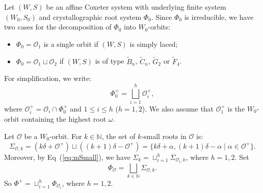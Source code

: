 \documentclass{amsart}
\theoremstyle{definition}
\newcommand{\mo}{\mathcal{O}}
\begin{document}
Let $(W,S)$ be an affine Coxeter system with underlying finite system $(W_0,S_0)$ and crystallographic root system $\Phi_0$. Since $\Phi_0$ is irreducible, we have two cases for the decomposition of $\Phi_0$ into $W_0$-orbits:
\begin{itemize}
    \item $\Phi_0=\mo_1$ is a single orbit if $(W,S)$ is simply laced;
    \item $\Phi_0=\mo_1\sqcup\mo_2$ if $(W,S)$ is of type $\tilde B_n$, $\tilde C_n$, $\tilde G_2$ or $\tilde F_4$.
\end{itemize}
For simplification, we write:
$$
\Phi_0^+=\bigsqcup_{i=1}^h \mo_i^+,
$$ 
where $\mo_i^+=\mo_i \cap \Phi_0^+$ and $1\leq i\leq h$ ($h=1,2$). We also assume that $\mo_1^+$ is the $W_0$-orbit containing the highest root $\omega$. 

\smallskip

Let $\mo$ be a $W_0$-orbit. For $k\in\mathbb N$, the set of $k$-small roots in $\mo$ is:
\begin{equation}
\Sigma_{\mo,k} =(k\delta+\mo^+)\sqcup \left((k+1)\delta-\mo^+\right) =\{k\delta + \alpha, (k+1)\delta - \alpha \mid \alpha \in \mo^+\}.
\end{equation}
Moreover, by Eq~(\ref{eq:mSmall}), we have $\Sigma_k=\sqcup_{i=1}^h\Sigma_{\mo_i,k}$, where $h=1,2$. Set 
$$
\Phi_{\mo}=\bigsqcup_{k\in \mathbb N} \Sigma_{\mo,k}.
$$
So $\Phi^+=\sqcup_{i=1}^h\Phi_{\mo_i}$, where $h=1,2$. 
\end{document}
